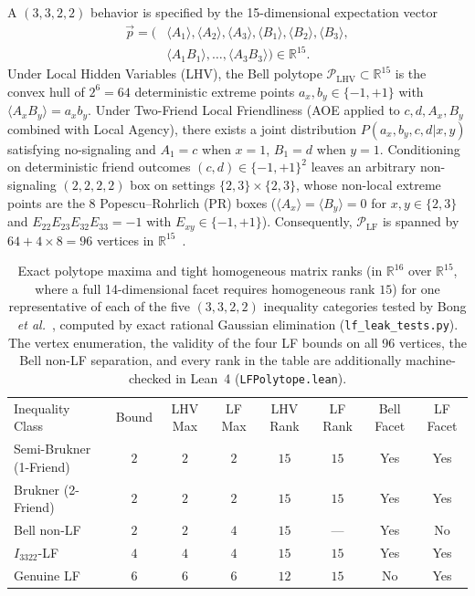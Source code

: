A $(3,3,2,2)$ behavior is specified by the 15-dimensional expectation vector
\begin{equation}
\begin{aligned}
    \vec{p} = \bigl(&\langle A_1 \rangle, \langle A_2 \rangle, \langle A_3 \rangle, \langle B_1 \rangle, \langle B_2 \rangle, \langle B_3 \rangle, \\
    &\langle A_1 B_1 \rangle, \dots, \langle A_3 B_3 \rangle\bigr) \in \mathbb{R}^{15}.
\end{aligned}
\end{equation}
Under Local Hidden Variables (LHV), the Bell polytope $\mathcal{P}_{\mathrm{LHV}} \subset \mathbb{R}^{15}$ is the convex hull of $2^6 = 64$ deterministic extreme points $a_x, b_y \in \{-1, +1\}$ with $\langle A_x B_y \rangle = a_x b_y$. Under Two-Friend Local Friendliness (AOE applied to $c, d, A_x, B_y$ combined with Local Agency), there exists a joint distribution $P(a_x, b_y, c, d | x, y)$ satisfying no-signaling and $A_1 = c$ when $x = 1$, $B_1 = d$ when $y = 1$. Conditioning on deterministic friend outcomes $(c, d) \in \{-1, +1\}^2$ leaves an arbitrary non-signaling $(2,2,2,2)$ box on settings $\{2, 3\} \times \{2, 3\}$, whose non-local extreme points are the 8 Popescu--Rohrlich (PR) boxes ($\langle A_x \rangle = \langle B_y \rangle = 0$ for $x, y \in \{2, 3\}$ and $E_{22} E_{23} E_{32} E_{33} = -1$ with $E_{xy} \in \{-1, +1\}$). Consequently, $\mathcal{P}_{\mathrm{LF}}$ is spanned by $64 + 4 \times 8 = 96$ vertices in $\mathbb{R}^{15}$~\cite{bong2020}.

\begin{table}[t]
\caption{Exact polytope maxima and tight homogeneous matrix ranks (in $\mathbb{R}^{16}$ over $\mathbb{R}^{15}$, where a full 14-dimensional facet requires homogeneous rank $15$) for one representative of each of the five $(3,3,2,2)$ inequality categories tested by Bong \emph{et al.}~\cite{bong2020}, computed by exact rational Gaussian elimination (\texttt{lf\_leak\_tests.py}). The vertex enumeration, the validity of the four LF bounds on all 96 vertices, the Bell non-LF separation, and every rank in the table are additionally machine-checked in Lean~4 (\texttt{LFPolytope.lean}).}
\label{tab:polytope_ranks}
\begin{ruledtabular}
\begin{tabular}{lccccccc}
Inequality Class & Bound & LHV Max & LF Max & LHV Rank & LF Rank & Bell Facet & LF Facet \\
\colrule
Semi-Brukner (1-Friend) & $2$ & $2$ & $2$ & $15$ & $15$ & Yes & Yes \\
Brukner (2-Friend)      & $2$ & $2$ & $2$ & $15$ & $15$ & Yes & Yes \\
Bell non-LF             & $2$ & $2$ & $4$ & $15$ & ---  & Yes & No  \\
$I_{3322}$-LF           & $4$ & $4$ & $4$ & $15$ & $15$ & Yes & Yes \\
Genuine LF              & $6$ & $6$ & $6$ & $12$ & $15$ & No  & Yes \\
\end{tabular}
\end{ruledtabular}
\end{table}

